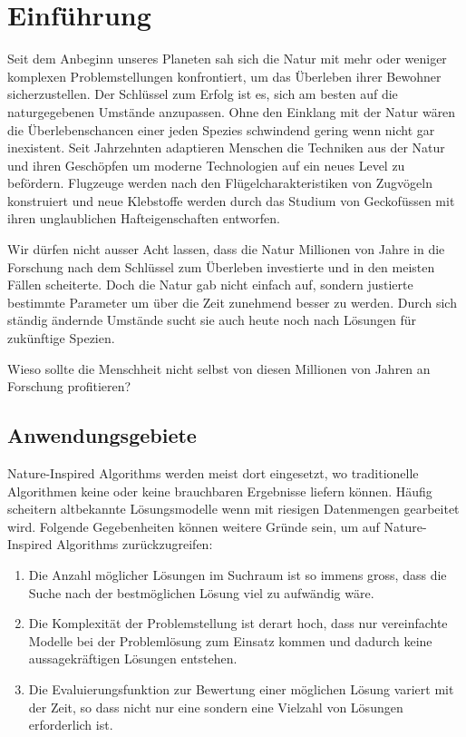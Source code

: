 \chapter{Einführung}

Seit dem Anbeginn unseres Planeten sah sich die Natur mit mehr oder weniger
komplexen Problemstellungen konfrontiert, um das Überleben ihrer Bewohner
sicherzustellen. Der Schlüssel zum Erfolg ist es, sich am besten auf die
naturgegebenen Umstände anzupassen. Ohne den Einklang mit der Natur wären die
Überlebenschancen einer jeden Spezies schwindend gering wenn nicht gar inexistent.
Seit Jahrzehnten adaptieren Menschen die Techniken aus der Natur und ihren Geschöpfen
um moderne Technologien auf ein neues Level zu befördern. Flugzeuge werden nach den
Flügelcharakteristiken von Zugvögeln konstruiert und neue Klebstoffe werden durch das
Studium von Geckofüssen mit ihren unglaublichen Hafteigenschaften entworfen. \cite{Cro14}

Wir dürfen nicht ausser Acht lassen, dass die Natur Millionen von Jahre in die Forschung
nach dem Schlüssel zum Überleben investierte und in den meisten Fällen scheiterte. Doch
die Natur gab nicht einfach auf, sondern justierte bestimmte Parameter um über die Zeit
zunehmend besser zu werden. Durch sich ständig ändernde Umstände sucht sie auch heute noch
nach Lösungen für zukünftige Spezien.

Wieso sollte die Menschheit nicht selbst von diesen Millionen von Jahren an Forschung profitieren?

\section{Anwendungsgebiete}

Nature-Inspired Algorithms werden meist dort eingesetzt, wo traditionelle Algorithmen keine oder
keine brauchbaren Ergebnisse liefern können. Häufig scheitern altbekannte Lösungsmodelle wenn mit
riesigen Datenmengen gearbeitet wird. Folgende Gegebenheiten können weitere Gründe sein, um auf
Nature-Inspired Algorithms zurückzugreifen:

\begin{enumerate}
    \item Die Anzahl möglicher Lösungen im Suchraum ist so immens gross, dass die Suche nach der bestmöglichen
          Lösung viel zu aufwändig wäre.
    \item Die Komplexität der Problemstellung ist derart hoch, dass nur vereinfachte Modelle bei der Problemlösung
          zum Einsatz kommen und dadurch keine aussagekräftigen Lösungen entstehen.
    \item Die Evaluierungsfunktion zur Bewertung einer möglichen Lösung variert mit der Zeit, so dass nicht nur eine
          sondern eine Vielzahl von Lösungen erforderlich ist.
\end{enumerate}

